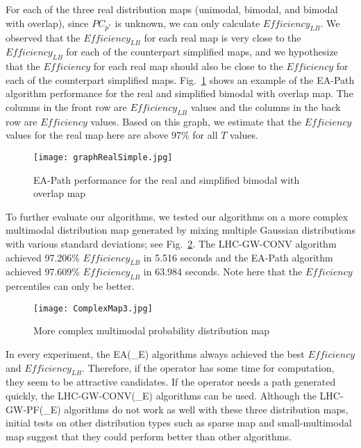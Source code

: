 For each of the three real distribution maps (unimodal, bimodal, and bimodal with overlap), since $PC_{p^*}$ is unknown, we can only calculate $\mathit{Efficiency_{LB}}$. We observed that the $\mathit{Efficiency_{LB}}$ for each real map is very close to the $\mathit{Efficiency_{LB}}$ for each of the counterpart simplified maps, and we hypothesize that the $\mathit{Efficiency}$ for each real map should also be close to the $\mathit{Efficiency}$ for each of the counterpart simplified maps. Fig.~\ref{graphRealSimple} shows an example of the EA-Path algorithm performance for the real and simplified bimodal with overlap map. The columns in the front row are $\mathit{Efficiency_{LB}}$ values and the columns in the back row are $\mathit{Efficiency}$ values. Based on this graph, we estimate that the $\mathit{Efficiency}$ values for the real map here are above 97\% for all $T$ values.

\begin{figure}
\vspace*{-3ex}
\centering
\texttt{[image: graphRealSimple.jpg]}
\caption{EA-Path performance for the real and simplified bimodal with overlap map}
\label{graphRealSimple}
\end{figure}

To further evaluate our algorithms, we tested our algorithms on a more complex multimodal distribution map generated by mixing multiple Gaussian distributions with various standard deviations; see Fig.~\ref{ComplexMap}. The LHC-GW-CONV algorithm achieved 97.206\% $\mathit{Efficiency_{LB}}$ in 5.516 seconds and the EA-Path algorithm achieved 97.609\% $\mathit{Efficiency_{LB}}$ in 63.984 seconds. Note here that the $\mathit{Efficiency}$ percentiles can only be better.

\begin{figure}
\centering
\texttt{[image: ComplexMap3.jpg]}
\caption{More complex multimodal probability distribution map}
\label{ComplexMap}
\vspace*{-3ex}
\end{figure}

In every experiment, the EA(\_E) algorithms always achieved the best $\mathit{Efficiency}$ and $\mathit{Efficiency_{LB}}$. Therefore, if the operator has some time for computation, they seem to be attractive candidates. If the operator needs a path generated quickly, the LHC-GW-CONV(\_E) algorithms can be used. Although the LHC-GW-PF(\_E) algorithms do not work as well with these three distribution maps, initial tests on other distribution types such as sparse map and small-multimodal map suggest that they could perform better than other algorithms.


